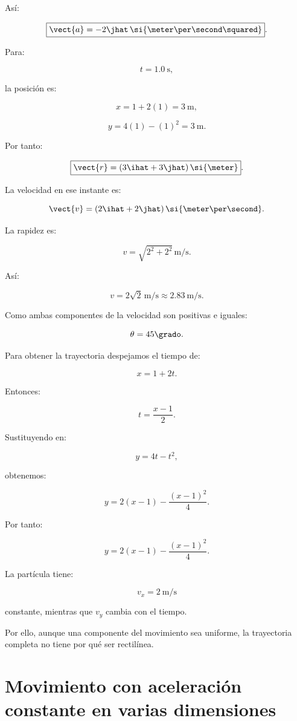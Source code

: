 Así:

\[
\boxed{
\vect{a}
=
-2\jhat\,
\si{\meter\per\second\squared}
}.
\]

Para:

\[
t=\SI{1.0}{\second},
\]

la posición es:

\[
x=1+2(1)=\SI{3}{\meter},
\]

\[
y=4(1)-(1)^2=\SI{3}{\meter}.
\]

Por tanto:

\[
\boxed{
\vect{r}
=
(3\ihat+3\jhat)\,\si{\meter}
}.
\]

La velocidad en ese instante es:

\[
\vect{v}
=
(2\ihat+2\jhat)\,
\si{\meter\per\second}.
\]

La rapidez es:

\[
v
=
\sqrt{2^2+2^2}\,
\si{\meter\per\second}.
\]

Así:

\[
\boxed{
v
=
2\sqrt{2}\,\si{\meter\per\second}
\approx
\SI{2.83}{\meter\per\second}
}.
\]

Como ambas componentes de la velocidad son positivas e iguales:

\[
\theta=45\grado.
\]

Para obtener la trayectoria despejamos el tiempo de:

\[
x=1+2t.
\]

Entonces:

\[
t=\frac{x-1}{2}.
\]

Sustituyendo en:

\[
y=4t-t^2,
\]

obtenemos:

\[
y
=
2(x-1)
-
\frac{(x-1)^2}{4}.
\]

Por tanto:

\[
\boxed{
y
=
2(x-1)
-
\frac{(x-1)^2}{4}
}.
\]

\begin{interpretacion}
La partícula tiene:

\[
v_x=\SI{2}{\meter\per\second}
\]

constante, mientras que \(v_y\) cambia con el tiempo.

Por ello, aunque una componente del movimiento sea uniforme, la trayectoria
completa no tiene por qué ser rectilínea.
\end{interpretacion}


\section{Movimiento con aceleración constante en varias dimensiones}

